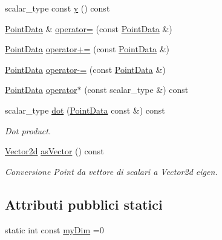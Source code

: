 \begin{DoxyCompactItemize}
scalar\-\_\-type const \hyperlink{classPointData_a90dbf32a9579cb1cde67458d4ad38209}{y} () const 
\item 
\hyperlink{classPointData}{Point\-Data} \& \hyperlink{classPointData_aee654398556253e58e2eac86dacd6bc8}{operator=} (const \hyperlink{classPointData}{Point\-Data} \&)
\item 
\hyperlink{classPointData}{Point\-Data} \hyperlink{classPointData_a2a1e7d5a276c675e92c4cb4daad1c6c3}{operator+=} (const \hyperlink{classPointData}{Point\-Data} \&)
\item 
\hyperlink{classPointData}{Point\-Data} \hyperlink{classPointData_ac96b0706201f8fa9d47a11b8ca41f50f}{operator-\/=} (const \hyperlink{classPointData}{Point\-Data} \&)
\item 
\hyperlink{classPointData}{Point\-Data} \hyperlink{classPointData_ad19da242c16ae018a91b058dd1f71c5c}{operator$\ast$} (const scalar\-\_\-type \&) const 
\item 
scalar\-\_\-type \hyperlink{classPointData_aaa93107dbb5690747c82fccf45a13d6b}{dot} (\hyperlink{classPointData}{Point\-Data} const \&) const 
\begin{DoxyCompactList}\small\item\em Dot product. \end{DoxyCompactList}\item 
\hyperlink{Core_8h_a09205951ae66bf900cc5cc57e2192667}{Vector2d} \hyperlink{classPointData_a262fed95726ae252592717fe3cf2f9dd}{as\-Vector} () const 
\begin{DoxyCompactList}\small\item\em Conversione Point da vettore di scalari a Vector2d eigen. \end{DoxyCompactList}\end{DoxyCompactItemize}
\subsection*{Attributi pubblici statici}
\begin{DoxyCompactItemize}
\item 
static int const \hyperlink{classPointData_a71cd9807bc1c94983debb8bbe034916f}{my\-Dim} =0
\end{DoxyCompactItemize}
